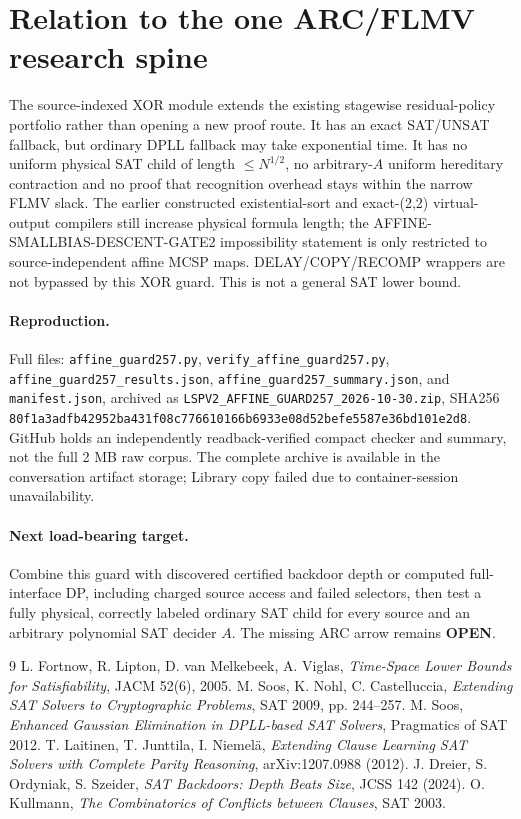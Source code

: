 \documentclass[11pt]{article}
\begin{document}
\section{Relation to the one ARC/FLMV research spine}
The source-indexed XOR module extends the existing stagewise residual-policy portfolio rather than opening a new proof route. It has an exact SAT/UNSAT fallback, but ordinary DPLL fallback may take exponential time. It has no uniform physical SAT child of length $\le N^{1/2}$, no arbitrary-$A$ uniform hereditary contraction and no proof that recognition overhead stays within the narrow FLMV slack. The earlier constructed existential-sort and exact-(2,2) virtual-output compilers still increase physical formula length; the AFFINE-SMALLBIAS-DESCENT-GATE2 impossibility statement is only restricted to source-independent affine MCSP maps. DELAY/COPY/RECOMP wrappers are not bypassed by this XOR guard. This is not a general SAT lower bound.

\paragraph{Reproduction.} Full files: \texttt{affine\_guard257.py}, \texttt{verify\_affine\_guard257.py}, \texttt{affine\_guard257\_results.json}, \texttt{affine\_guard257\_summary.json}, and \texttt{manifest.json}, archived as \texttt{LSPV2\_AFFINE\_GUARD257\_2026-10-30.zip}, SHA256 \texttt{80f1a3adfb42952ba431f08c776610166b6933e08d52befe5587e36bd101e2d8}. GitHub holds an independently readback-verified compact checker and summary, not the full 2 MB raw corpus. The complete archive is available in the conversation artifact storage; Library copy failed due to container-session unavailability.

\paragraph{Next load-bearing target.} Combine this guard with discovered certified backdoor depth or computed full-interface DP, including charged source access and failed selectors, then test a fully physical, correctly labeled ordinary SAT child for every source and an arbitrary polynomial SAT decider $A$. The missing ARC arrow remains \textbf{OPEN}.

\begin{thebibliography}{9}
 L. Fortnow, R. Lipton, D. van Melkebeek, A. Viglas, \emph{Time-Space Lower Bounds for Satisfiability}, JACM 52(6), 2005.
 M. Soos, K. Nohl, C. Castelluccia, \emph{Extending SAT Solvers to Cryptographic Problems}, SAT 2009, pp. 244--257.
 M. Soos, \emph{Enhanced Gaussian Elimination in DPLL-based SAT Solvers}, Pragmatics of SAT 2012.
 T. Laitinen, T. Junttila, I. Niemel\"a, \emph{Extending Clause Learning SAT Solvers with Complete Parity Reasoning}, arXiv:1207.0988 (2012).
 J. Dreier, S. Ordyniak, S. Szeider, \emph{SAT Backdoors: Depth Beats Size}, JCSS 142 (2024).
 O. Kullmann, \emph{The Combinatorics of Conflicts between Clauses}, SAT 2003.
\end{thebibliography}
\end{document}

